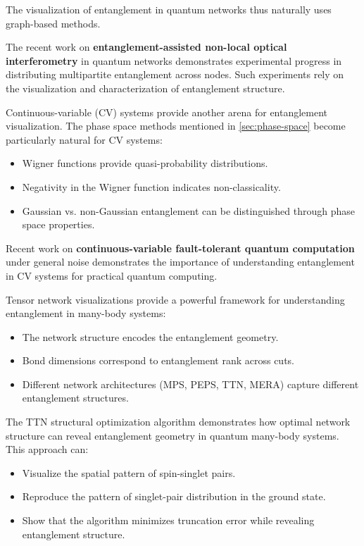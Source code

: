 \documentclass[12pt,a4paper]{article}
\begin{document}
The visualization of entanglement in quantum networks thus naturally uses graph-based methods.

The recent work on \textbf{entanglement-assisted non-local optical interferometry} in quantum networks demonstrates experimental progress in distributing multipartite entanglement across nodes. Such experiments rely on the visualization and characterization of entanglement structure.

Continuous-variable (CV) systems provide another arena for entanglement visualization. The phase space methods mentioned in \cref{sec:phase-space} become particularly natural for CV systems:
\begin{itemize}
	\item Wigner functions provide quasi-probability distributions.
	\item Negativity in the Wigner function indicates non-classicality.
	\item Gaussian vs. non-Gaussian entanglement can be distinguished through phase space properties.
\end{itemize}

Recent work on \textbf{continuous-variable fault-tolerant quantum computation} under general noise demonstrates the importance of understanding entanglement in CV systems for practical quantum computing.

Tensor network visualizations provide a powerful framework for understanding entanglement in many-body systems:
\begin{itemize}
	\item The network structure encodes the entanglement geometry.
	\item Bond dimensions correspond to entanglement rank across cuts.
	\item Different network architectures (MPS, PEPS, TTN, MERA) capture different entanglement structures.
\end{itemize}

The TTN structural optimization algorithm \cite{Hikihara2024} demonstrates how optimal network structure can reveal entanglement geometry in quantum many-body systems. This approach can:
\begin{itemize}
	\item Visualize the spatial pattern of spin-singlet pairs.
	\item Reproduce the pattern of singlet-pair distribution in the ground state.
	\item Show that the algorithm minimizes truncation error while revealing entanglement structure.
\end{itemize}
\end{document}

